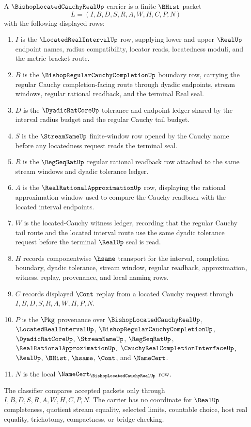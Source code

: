\begin{definition}
\label{def:bishop-located-cauchy-real-carrier}
A $\BishopLocatedCauchyRealUp$ carrier is a finite $\BHist$ packet
$$
L=(I,B,D,S,R,A,W,H,C,P,N)
$$
with the following displayed rows:
\begin{enumerate}
\item $I$ is the $\LocatedRealIntervalUp$ row, supplying lower and upper $\RealUp$ endpoint names, radius compatibility, locator reads, locatedness moduli, and the metric bracket route.
\item $B$ is the $\BishopRegularCauchyCompletionUp$ boundary row, carrying the regular Cauchy completion-facing route through dyadic endpoints, stream windows, regular rational readback, and the terminal Real seal.
\item $D$ is the $\DyadicRatCoreUp$ tolerance and endpoint ledger shared by the interval radius budget and the regular Cauchy tail budget.
\item $S$ is the $\StreamNameUp$ finite-window row opened by the Cauchy name before any locatedness request reads the terminal seal.
\item $R$ is the $\RegSeqRatUp$ regular rational readback row attached to the same stream windows and dyadic tolerance ledger.
\item $A$ is the $\RealRationalApproximationUp$ row, displaying the rational approximation window used to compare the Cauchy readback with the located interval endpoints.
\item $W$ is the located-Cauchy witness ledger, recording that the regular Cauchy tail route and the located interval route use the same dyadic tolerance request before the terminal $\RealUp$ seal is read.
\item $H$ records componentwise $\hsame$ transport for the interval, completion boundary, dyadic tolerance, stream window, regular readback, approximation, witness, replay, provenance, and local naming rows.
\item $C$ records displayed $\Cont$ replay from a located Cauchy request through $I,B,D,S,R,A,W,H,P,N$.
\item $P$ is the $\Pkg$ provenance over $\BishopLocatedCauchyRealUp$, $\LocatedRealIntervalUp$, $\BishopRegularCauchyCompletionUp$, $\DyadicRatCoreUp$, $\StreamNameUp$, $\RegSeqRatUp$, $\RealRationalApproximationUp$, $\CauchyRealCompletionInterfaceUp$, $\RealUp$, $\BHist$, $\hsame$, $\Cont$, and $\NameCert$.
\item $N$ is the local $\NameCert_{\BishopLocatedCauchyRealUp}$ row.
\end{enumerate}
The classifier compares accepted packets only through $I,B,D,S,R,A,W,H,C,P,N$. The carrier has no coordinate for $\RealUp$ completeness, quotient stream equality, selected limits, countable choice, host real equality, trichotomy, compactness, or bridge checking.
\end{definition}


